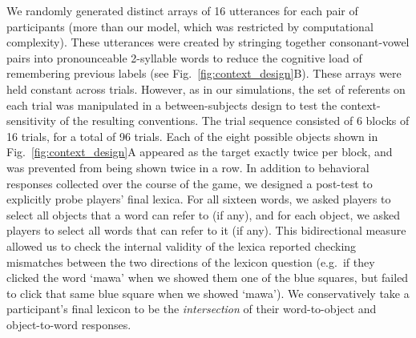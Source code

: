 We randomly generated distinct arrays of 16 utterances for each pair of participants (more than our model, which was restricted by computational complexity).
These utterances were created by stringing together consonant-vowel pairs into pronounceable 2-syllable words to reduce the cognitive load of remembering previous labels (see Fig.~\ref{fig:context_design}B).
These arrays were held constant across trials.
However, as in our simulations, the set of referents on each trial was manipulated in a between-subjects design to test the context-sensitivity of the resulting conventions. 
The trial sequence consisted of 6 blocks of 16 trials, for a total of 96 trials.
Each of the eight possible objects shown in Fig.~\ref{fig:context_design}A appeared as the target exactly twice per block, and was prevented from being shown twice in a row.
In addition to behavioral responses collected over the course of the game, we designed a post-test to explicitly probe players' final lexica. 
For all sixteen words, we asked players to select all objects that a word can refer to (if any), and for each object, we asked players to select all words that can refer to it (if any). 
This bidirectional measure allowed us to check the internal validity of the lexica reported checking mismatches between the two directions of the lexicon question (e.g.\ if they clicked the word `mawa' when we showed them one of the blue squares, but failed to click that same blue square when we showed `mawa').
We conservatively take a participant's final lexicon to be the \emph{intersection} of their word-to-object and object-to-word responses.

